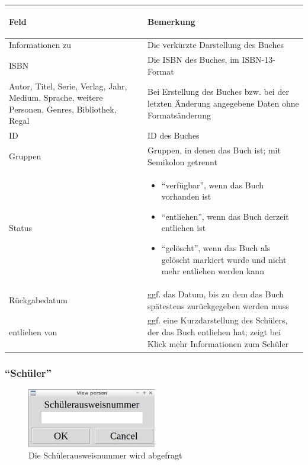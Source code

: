 \begin{tabular}{|p{}|p{}|}\hline
\begin{center}Feld\end{center} & \begin{center}Bemerkung\end{center}\\
\hline
Informationen zu & Die verkürzte Darstellung des Buches\\
\hline
ISBN & Die ISBN des Buches, im ISBN-13-Format\\
\hline
Autor, Titel, Serie, Verlag, Jahr, Medium, Sprache, weitere Personen, Genres, Bibliothek, Regal & Bei Erstellung des Buches bzw. bei der letzten Änderung angegebene Daten ohne Formatsänderung\\
\hline
ID & ID des Buches\\
\hline
Gruppen & Gruppen, in denen das Buch ist; mit Semikolon getrennt\\
\hline
Status & 
\begin{itemize}[leftmargin=*]
\item ``verfügbar'', wenn das Buch vorhanden ist
\item ``entliehen'', wenn das Buch derzeit entliehen ist
\item ``gelöscht'', wenn das Buch als gelöscht markiert wurde und nicht mehr entliehen werden kann
\end{itemize}
\\
\hline
Rückgabedatum & ggf. das Datum, bis zu dem das Buch spätestens zurückgegeben werden muss\\
\hline
entliehen von & ggf. eine Kurzdarstellung des Schülers, der das Buch entliehen hat; zeigt bei Klick mehr Informationen zum Schüler\\
\hline
\end{tabular}

\subsubsection{``Schüler''}
\label{subsubsec:detail:view:person}
\begin{figure}\includegraphics{images/gui2/view_person_ask.jpg}\caption{Die Schülerausweisnummer wird abgefragt}\label{fig:view_person_ask}\end{figure}

